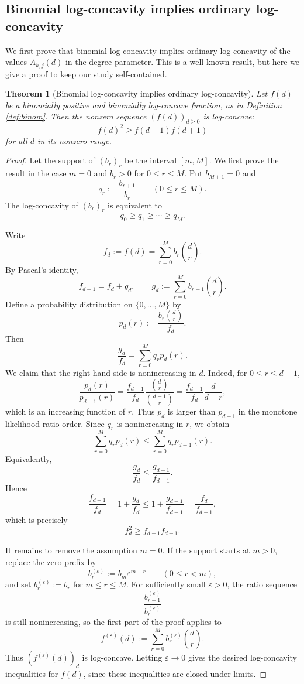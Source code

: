 \documentclass[11pt]{amsart}
\numberwithin{equation}{section}
\newtheorem{theorem}{Theorem}[section]
\theoremstyle{remark}
\begin{document}
\subsection{Binomial log-concavity implies ordinary log-concavity}

We first prove that binomial log-concavity implies ordinary log-concavity of the values $A_{k,j}(d)$ in the degree parameter. This is a well-known result, but here we give a proof to keep our study self-contained. 


\begin{theorem}[Binomial log-concavity implies ordinary log-concavity]\label{thm:binomial-lc-implies-lc}
Let $f(d)$ be a binomially positive and binomially log-concave function, as in Definition \ref{def:binom}.
Then the nonzero sequence $(f(d))_{d\ge0}$ is log-concave:
\[
  f(d)^2\ge f(d-1)f(d+1)
\]
for all $d$ in its nonzero range.
\end{theorem}

\begin{proof}
Let the support of $(b_r)_r$ be the interval $[m,M]$.  We first prove the result in the case $m=0$ and $b_r>0$ for $0\le r\le M$.  Put $b_{M+1}=0$ and
\[
  q_r:=\frac{b_{r+1}}{b_r}\qquad(0\le r\le M).
\]
The log-concavity of $(b_r)_r$ is equivalent to
\[
  q_0\ge q_1\ge \cdots \ge q_M.
\]

Write
\[
  f_d:=f(d)=\sum_{r=0}^{M}b_r\binom dr.
\]
By Pascal's identity,
\[
  f_{d+1}=f_d+g_d,
  \qquad
  g_d:=\sum_{r=0}^{M}b_{r+1}\binom dr.
\]
Define a probability distribution on $\{0,\ldots,M\}$ by
\[
  p_d(r):=\frac{b_r\binom dr}{f_d}.
\]
Then
\[
  \frac{g_d}{f_d}
  =
  \sum_{r=0}^{M}q_r p_d(r).
\]
We claim that the right-hand side is nonincreasing in $d$.  Indeed, for $0\le r\le d-1$,
\[
  \frac{p_d(r)}{p_{d-1}(r)}
  =
  \frac{f_{d-1}}{f_d}\frac{\binom dr}{\binom{d-1}{r}}
  =
  \frac{f_{d-1}}{f_d}\frac{d}{d-r},
\]
which is an increasing function of $r$.  Thus $p_d$ is larger than $p_{d-1}$ in the monotone likelihood-ratio order.  Since $q_r$ is nonincreasing in $r$, we obtain
\[
  \sum_{r=0}^{M}q_r p_d(r)
  \le
  \sum_{r=0}^{M}q_r p_{d-1}(r).
\]
Equivalently,
\[
  \frac{g_d}{f_d}\le \frac{g_{d-1}}{f_{d-1}}.
\]
Hence
\[
  \frac{f_{d+1}}{f_d}
  =
  1+\frac{g_d}{f_d}
  \le
  1+\frac{g_{d-1}}{f_{d-1}}
  =
  \frac{f_d}{f_{d-1}},
\]
which is precisely
\[
  f_d^2\ge f_{d-1}f_{d+1}.
\]

It remains to remove the assumption $m=0$.  If the support starts at $m>0$, replace the zero prefix by
\[
  b_r^{(\varepsilon)}:=b_m\varepsilon^{m-r}
  \qquad(0\le r<m),
\]
and set $b_r^{(\varepsilon)}:=b_r$ for $m\le r\le M$.  For sufficiently small $\varepsilon>0$, the ratio sequence
\[
  \frac{b_{r+1}^{(\varepsilon)}}{b_r^{(\varepsilon)}}
\]
is still nonincreasing, so the first part of the proof applies to
\[
  f^{(\varepsilon)}(d)
  :=
  \sum_{r=0}^{M}b_r^{(\varepsilon)}\binom dr.
\]
Thus $(f^{(\varepsilon)}(d))_d$ is log-concave.  Letting $\varepsilon\to0$ gives the desired log-concavity inequalities for $f(d)$, since these inequalities are closed under limits.
\end{proof}
\end{document}
